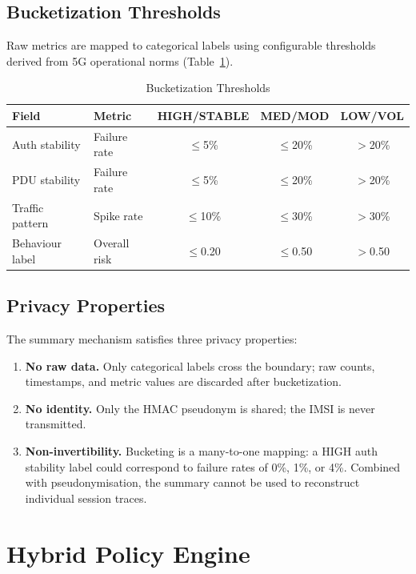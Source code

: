 \documentclass[conference]{IEEEtran}
\begin{document}
\subsection{Bucketization Thresholds}
Raw metrics are mapped to categorical labels using configurable thresholds derived from 5G operational norms (Table~\ref{tab:bucket_thresholds}).

\begin{table}[t]
\centering
\caption{Bucketization Thresholds}
\label{tab:bucket_thresholds}
\begin{tabular}{@{}llccc@{}}
\toprule
\textbf{Field} & \textbf{Metric} & \textbf{HIGH/STABLE} & \textbf{MED/MOD} & \textbf{LOW/VOL} \\
\midrule
Auth stability & Failure rate & $\leq$5\% & $\leq$20\% & $>$20\% \\
PDU stability & Failure rate & $\leq$5\% & $\leq$20\% & $>$20\% \\
Traffic pattern & Spike rate & $\leq$10\% & $\leq$30\% & $>$30\% \\
Behaviour label & Overall risk & $\leq$0.20 & $\leq$0.50 & $>$0.50 \\
\bottomrule
\end{tabular}
\end{table}

\subsection{Privacy Properties}
The summary mechanism satisfies three privacy properties:

\begin{enumerate}
    \item \textbf{No raw data.} Only categorical labels cross the boundary; raw counts, timestamps, and metric values are discarded after bucketization.
    \item \textbf{No identity.} Only the HMAC pseudonym is shared; the IMSI is never transmitted.
    \item \textbf{Non-invertibility.} Bucketing is a many-to-one mapping: a HIGH auth stability label could correspond to failure rates of 0\%, 1\%, or 4\%. Combined with pseudonymisation, the summary cannot be used to reconstruct individual session traces.
\end{enumerate}

\section{Hybrid Policy Engine}
\label{sec:policy}
\end{document}
